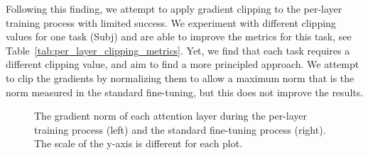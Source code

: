 \documentclass[11pt]{article}
\begin{document}
Following this finding, we attempt to apply gradient clipping to the per-layer training process with limited success.
We experiment with different clipping values for one task (Subj) and are able to improve the metrics for this task, see Table~\ref{tab:per_layer_clipping_metrics}.
Yet, we find that each task requires a different clipping value, and aim to find a more principled approach.
We attempt to clip the gradients by normalizing them to allow a maximum norm that is the norm measured in the standard fine-tuning, but this does not improve the results.


\begin{figure}%
	\centering
	\caption{The gradient norm of each attention layer during the per-layer training process (left) and the standard fine-tuning process (right). The scale of the y-axis is different for each plot.}
	\label{grad_norm}
\end{figure}
\end{document}
